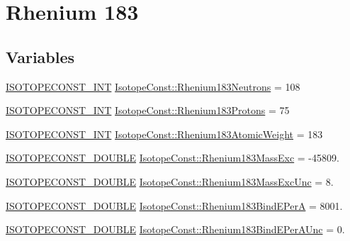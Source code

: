 \hypertarget{group___isotope_const-_rhenium-_re183}{}\section{Rhenium 183}
\label{group___isotope_const-_rhenium-_re183}
\subsection*{Variables}
\begin{DoxyCompactItemize}
\item 
\mbox{\hyperlink{group___isotope_const-_macros_ga5f18360b3e99483a35c32d789e62621c}{I\+S\+O\+T\+O\+P\+E\+C\+O\+N\+S\+T\+\_\+\+I\+NT}} \mbox{\hyperlink{group___isotope_const-_rhenium-_re183_ga8090fa9c121833c3e925d515f47683e8}{Isotope\+Const\+::\+Rhenium183\+Neutrons}} = 108
\item 
\mbox{\hyperlink{group___isotope_const-_macros_ga5f18360b3e99483a35c32d789e62621c}{I\+S\+O\+T\+O\+P\+E\+C\+O\+N\+S\+T\+\_\+\+I\+NT}} \mbox{\hyperlink{group___isotope_const-_rhenium-_re183_gaedb30194d9cd4f4cc329b541dc6011f2}{Isotope\+Const\+::\+Rhenium183\+Protons}} = 75
\item 
\mbox{\hyperlink{group___isotope_const-_macros_ga5f18360b3e99483a35c32d789e62621c}{I\+S\+O\+T\+O\+P\+E\+C\+O\+N\+S\+T\+\_\+\+I\+NT}} \mbox{\hyperlink{group___isotope_const-_rhenium-_re183_ga343c0b55aa8cd06b25304641afee03bf}{Isotope\+Const\+::\+Rhenium183\+Atomic\+Weight}} = 183
\item 
\mbox{\hyperlink{group___isotope_const-_macros_ga8f45a7272ce02c0b4c65c44636ed719a}{I\+S\+O\+T\+O\+P\+E\+C\+O\+N\+S\+T\+\_\+\+D\+O\+U\+B\+LE}} \mbox{\hyperlink{group___isotope_const-_rhenium-_re183_gad8ca43a779e54266f9648374b8080e15}{Isotope\+Const\+::\+Rhenium183\+Mass\+Exc}} = -\/45809.
\item 
\mbox{\hyperlink{group___isotope_const-_macros_ga8f45a7272ce02c0b4c65c44636ed719a}{I\+S\+O\+T\+O\+P\+E\+C\+O\+N\+S\+T\+\_\+\+D\+O\+U\+B\+LE}} \mbox{\hyperlink{group___isotope_const-_rhenium-_re183_ga0e26b57cf03723e758ed226cb0560acd}{Isotope\+Const\+::\+Rhenium183\+Mass\+Exc\+Unc}} = 8.
\item 
\mbox{\hyperlink{group___isotope_const-_macros_ga8f45a7272ce02c0b4c65c44636ed719a}{I\+S\+O\+T\+O\+P\+E\+C\+O\+N\+S\+T\+\_\+\+D\+O\+U\+B\+LE}} \mbox{\hyperlink{group___isotope_const-_rhenium-_re183_ga8c4bbb82564d77c7c891ca1ec545e6ee}{Isotope\+Const\+::\+Rhenium183\+Bind\+E\+PerA}} = 8001.
\item 
\mbox{\hyperlink{group___isotope_const-_macros_ga8f45a7272ce02c0b4c65c44636ed719a}{I\+S\+O\+T\+O\+P\+E\+C\+O\+N\+S\+T\+\_\+\+D\+O\+U\+B\+LE}} \mbox{\hyperlink{group___isotope_const-_rhenium-_re183_gafeaf19563a582327b8af96caaa2e5208}{Isotope\+Const\+::\+Rhenium183\+Bind\+E\+Per\+A\+Unc}} = 0.

\end{DoxyCompactItemize}
